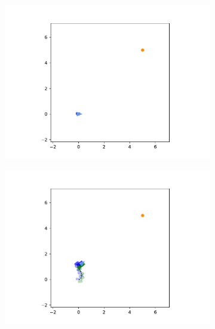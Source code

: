 \documentclass[main.tex]{subfiles}
\begin{document}
\begin{figure}[h]
    \centering
    \begin{subfigure}{0.20\textwidth}
        \centering
        \includegraphics[width=\textwidth]{figures/Simulations/sim1/frame_0.pdf}
    \end{subfigure}%
    \hfill
    \begin{subfigure}{0.20\textwidth}
        \centering
        \includegraphics[width=\textwidth]{figures/Simulations/sim1/frame_1.pdf}
    \end{subfigure}%
    \hfill
    \begin{subfigure}{0.20\textwidth}
        \centering

\end{subfigure}
\end{figure}
\end{document}
